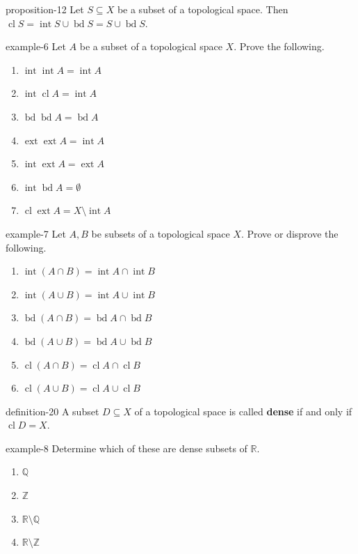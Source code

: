 \documentclass[10pt,]{article}
\newcommand{\terminology}[1]{\textbf{#1}}
\newcommand{\mb}{\mathbb}
\newcommand{\cl}{\operatorname{cl}}
\newcommand{\int}{\operatorname{int}}
\newcommand{\ext}{\operatorname{ext}}
\newcommand{\bd}{\operatorname{bd}}
\begin{document}
\begin{proposition}{}{}{proposition-12}%
\hypertarget{p-62}{}%
Let \(S\subseteq X\) be a subset of a topological space. Then \(\cl S=\int S\cup\bd S=S\cup\bd S\).%
\end{proposition}
\begin{example}{}{example-6}%
\hypertarget{p-63}{}%
Let \(A\) be a subset of a topological space \(X\). Prove the following.%
\leavevmode%
\begin{enumerate}
\item\hypertarget{li-42}{}\(\int\int A=\int A\)%
\item\hypertarget{li-43}{}\(\int\cl A=\int A\)%
\item\hypertarget{li-44}{}\(\bd\bd A=\bd A\)%
\item\hypertarget{li-45}{}\(\ext\ext A=\int A\)%
\item\hypertarget{li-46}{}\(\int\ext A=\ext A\)%
\item\hypertarget{li-47}{}\(\int\bd A=\emptyset\)%
\item\hypertarget{li-48}{}\(\cl\ext A=X\setminus\int A\)%
\end{enumerate}
\end{example}
\begin{example}{}{example-7}%
\hypertarget{p-64}{}%
Let \(A,B\) be subsets of a topological space \(X\). Prove or disprove the following.%
\leavevmode%
\begin{enumerate}
\item\hypertarget{li-49}{}\(\int(A\cap B)=\int A\cap\int B\)%
\item\hypertarget{li-50}{}\(\int(A\cup B)=\int A\cup\int B\)%
\item\hypertarget{li-51}{}\(\bd(A\cap B)=\bd A\cap\bd B\)%
\item\hypertarget{li-52}{}\(\bd(A\cup B)=\bd A\cup\bd B\)%
\item\hypertarget{li-53}{}\(\cl(A\cap B)=\cl A\cap\cl B\)%
\item\hypertarget{li-54}{}\(\cl(A\cup B)=\cl A\cup\cl B\)%
\end{enumerate}
\end{example}
\begin{definition}{}{definition-20}%
\hypertarget{p-65}{}%
A subset \(D\subseteq X\) of a topological space is called \terminology{dense} if and only if \(\cl D=X\).%
\end{definition}
\begin{example}{}{example-8}%
\hypertarget{p-66}{}%
Determine which of these are dense subsets of \(\mb R\).%
\leavevmode%
\begin{enumerate}
\item\hypertarget{li-55}{}\(\mb Q\)%
\item\hypertarget{li-56}{}\(\mb Z\)%
\item\hypertarget{li-57}{}\(\mb R\setminus\mb Q\)%
\item\hypertarget{li-58}{}\(\mb R\setminus\mb Z\)%
\end{enumerate}
\end{example}
\end{document}
